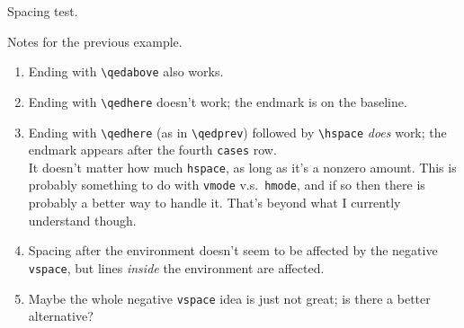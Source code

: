 Spacing test.

Notes for the previous example.
\begin{enumerate}
\item Ending with \verb|\qedabove| also works.
\item Ending with \verb|\qedhere| doesn't work; the endmark is on the baseline.
\item Ending with \verb|\qedhere| (as in \verb|\qedprev|) followed by \verb|\hspace| \emph{does} work; the endmark appears after the fourth \texttt{cases} row.\\
  It doesn't matter how much \texttt{hspace}, as long as it's a nonzero amount.
  This is probably something to do with \texttt{vmode} v.s.~\texttt{hmode}, and if so then there is probably a better way to handle it.
  That's beyond what I currently understand though.
\item Spacing after the environment doesn't seem to be affected by the negative \texttt{vspace}, but lines \emph{inside} the environment are affected.
\item Maybe the whole negative \texttt{vspace} idea is just not great; is there a better alternative?
\end{enumerate}


